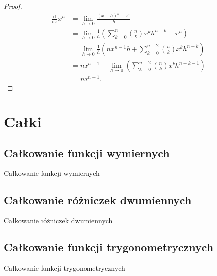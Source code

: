 \documentclass{parchment}
\begin{document}
\begin{proof}
\begin{align}
    \frac{\mathrm{d}}{\mathrm{d}x} x^n
    & = \lim_{h \to 0} \frac{(x+h)^n - x^n}{h} \\
    & = \lim_{h \to 0} \frac{1}{h} \left(\sum_{k=0}^n {n \choose k} x^k h^{n-k} - x^n \right) \\
    & = \lim_{h \to 0} \frac{1}{h} \left(nx^{n-1}h + \sum_{k=0}^{n-2} {n \choose k} x^k h^{n-k}\right) \\
    & = nx^{n-1} + \lim_{h \to 0} \left(\sum_{k=0}^{n-2} {n \choose k} x^k h^{n-k-1}\right) \\
    & = nx^{n-1}.
\end{align}
\end{proof}

\chapter{Całki}




\section{Całkowanie funkcji wymiernych}
Całkowanie funkcji wymiernych

\section{Całkowanie różniczek dwumiennych}
Całkowanie różniczek dwumiennych

\section{Całkowanie funkcji trygonometrycznych}
Całkowanie funkcji trygonometrycznych


\end{document}
